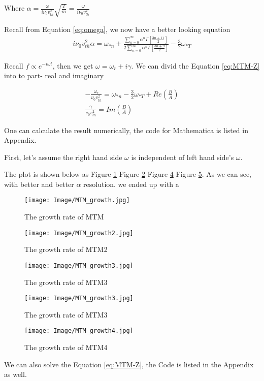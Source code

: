 Where $\alpha=\frac{\omega}{i\nu_0 v_{th}^3}\sqrt{\frac{T}{m}}=\frac{\omega}{i\nu_0 v_{th}^2}$

Recall from Equation \ref{eq:omega}, we now have a better looking equation
\begin{eqnarray}
     i\nu_0v_{th}^2\alpha=\omega_{*n}+\frac{\sum^\infty_{n=0} \alpha
     ^{n}  \Gamma[\frac{3n+11}{2}]
     }
     {2\sum^\infty_{n=0} \alpha
     ^{n}  \Gamma[\frac{3n+9}{2}]}-\frac{3}{2}\omega_{*T}
     \label{eq:MTM-Z}
\end{eqnarray}

Recall $f\propto e^{-i\omega t} $, then we get $\omega=\omega_r+i\gamma$. We can divid the Equation \ref{eq:MTM-Z} into to part- real and imaginary

\begin{eqnarray}
     -\frac{\omega_r}{\nu_0v_{th}^2}=\omega_{*n}-\frac{3}{2}\omega_{*T}+Re(\frac{B}{A})\\
     \frac{\gamma}{\nu_0v_{th}^2}=Im(\frac{B}{A})
\end{eqnarray}


One can calculate the result numerically, the code for Mathematica is listed in Appendix. 

First, let's assume the right hand side $\omega$ is independent of left hand side's $\omega$. 

The plot is shown below as Figure \ref{fig:MTM} Figure \ref{fig:MTM2} Figure \ref{fig:MTM3} Figure \ref{fig:MTM4}. As we can see, with better and better $\alpha$ resolution. we ended up with a 

\begin{figure}[h] \centering
        \texttt{[image: Image/MTM\_growth.jpg]}
        \caption{The growth rate of MTM}
        \label{fig:MTM}
\end{figure}

\begin{figure}[h] \centering
        \texttt{[image: Image/MTM\_growth2.jpg]}
        \caption{The growth rate of MTM2}
        \label{fig:MTM2}
\end{figure}

\begin{figure}[h] \centering
        \texttt{[image: Image/MTM\_growth3.jpg]}
        \caption{The growth rate of MTM3}
        \label{fig:MTM3}
\end{figure}

\begin{figure}[h] \centering
        \texttt{[image: Image/MTM\_growth3.jpg]}
        \caption{The growth rate of MTM3}
        \label{fig:MTM3}
\end{figure}

\begin{figure}[h] \centering
        \texttt{[image: Image/MTM\_growth4.jpg]}
        \caption{The growth rate of MTM4}
        \label{fig:MTM4}
\end{figure}

We can also solve the Equation \ref{eq:MTM-Z}, the Code is listed in the Appendix as well. 